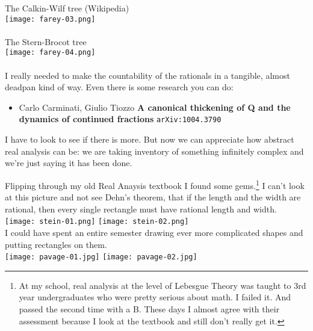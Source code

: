 \documentclass[12pt]{article}
\begin{document}
\newpage

\noindent The Calkin-Wilf tree (Wikipedia) \\
\texttt{[image: farey-03.png]} \\ \\
The Stern-Brocot tree \\ 
\texttt{[image: farey-04.png]} \\ \\
I really needed to make the countability of the rationals in a tangible, almost deadpan kind of way.  Even there is some research you can do:
\begin{itemize}
\item Carlo Carminati, Giulio Tiozzo \textbf{A canonical thickening of Q and the dynamics of continued fractions} \texttt{arXiv:1004.3790}
\end{itemize}
I have to look to see if there is more.  But now we can appreciate how abstract real analysis can be: we are taking inventory of something infinitely complex and we're just saying it has been done.

\newpage

\noindent Flipping through my old Real Anaysis textbook I found some gems.\footnote{At my school, real analysis at the level of Lebesgue Theory was taught to 3rd year undergraduates who were pretty serious about math. I failed it.  And passed the second time with a B.  These days I almost agree with their assessment because I look at the textbook and still don't really get it.}  I can't look at this picture and not see Dehn's theorem, that if the length and the width are rational, then every single rectangle must have rational length and width.\\ 
\texttt{[image: stein-01.png]}
\texttt{[image: stein-02.png]} \\ 
I could have spent an entire semester drawing ever more complicated shapes and putting rectangles on them. \\

\texttt{[image: pavage-01.jpg]}\hspace{1in}
\texttt{[image: pavage-02.jpg]}


\newpage
\end{document}
